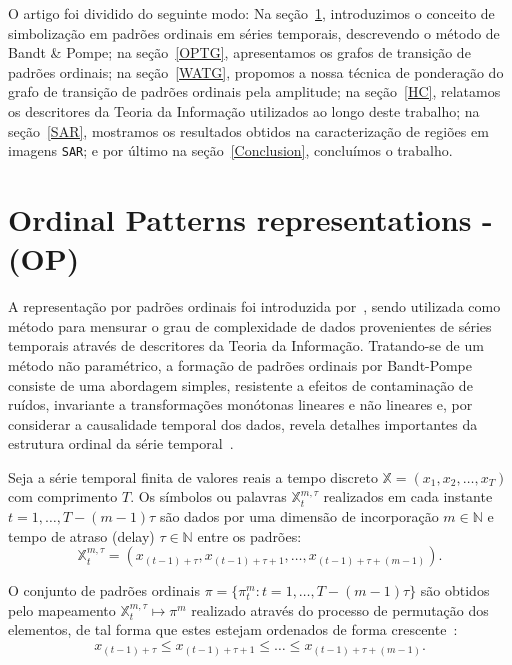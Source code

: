 \documentclass[12pt]{article}
\begin{document}
O artigo foi dividido do seguinte modo: 
Na seção~\ref{OP}, introduzimos o conceito de simbolização em padrões ordinais em séries temporais, descrevendo o método de Bandt \& Pompe; 
na seção~\ref{OPTG}, apresentamos os grafos de transição de padrões ordinais;
na seção~\ref{WATG}, propomos a nossa técnica de ponderação do grafo de transição de padrões ordinais pela amplitude;
na seção~\ref{HC}, relatamos os descritores da Teoria da Informação utilizados ao longo deste trabalho;
na seção~\ref{SAR}, mostramos os resultados obtidos na caracterização de regiões em imagens \texttt{SAR};
e por último na seção~\ref{Conclusion}, concluímos o trabalho.

\section{Ordinal Patterns representations - (OP)}\label{OP}

A representação por padrões ordinais foi introduzida por~\cite{Bandt2002Permutation}, sendo utilizada como método para mensurar o grau de complexidade de dados provenientes de séries temporais através de descritores da Teoria da Informação. 
Tratando-se de um método não paramétrico, a formação de padrões ordinais por Bandt-Pompe consiste de uma abordagem simples, resistente a efeitos de contaminação de ruídos, invariante a transformações monótonas lineares e não lineares e, por considerar a causalidade temporal dos dados, revela detalhes importantes da estrutura ordinal da série temporal~\citep{Larrondo2006Random}.

Seja a série temporal finita de valores reais a tempo discreto $\mathbb{X} = (x_1, x_2, \dots, x_T)$ com comprimento $T$.
Os símbolos ou palavras $\mathbb{X}_t^{m,\tau}$ realizados em cada instante $t = 1, \dots, T-(m-1)\tau$ são dados por uma dimensão de incorporação $m \in \mathbb{N}$ e tempo de atraso (delay) $\tau \in \mathbb{N}$ entre os padrões: 
\begin{equation}
    \mathbb{X}_t^{m,\tau} = (x_{(t-1)+\tau}, x_{(t-1)+\tau+1},\ldots, x_{(t-1)+\tau+(m-1)}).
\end{equation}

O conjunto de padrões ordinais $\pi = \{\pi_t^m : t = 1, \dots, T-(m-1)\tau\}$ são obtidos pelo mapeamento $\mathbb{X}^{m,\tau}_t \mapsto \pi^m$ realizado através do processo de permutação dos elementos, de tal forma que estes estejam ordenados de forma crescente~\citep{Ravetti2014noise}:
$$ x_{(t-1)+\tau} \leq x_{(t-1)+\tau+1} \leq \ldots \leq x_{(t-1)+\tau+(m-1)}. $$ 
\end{document}
